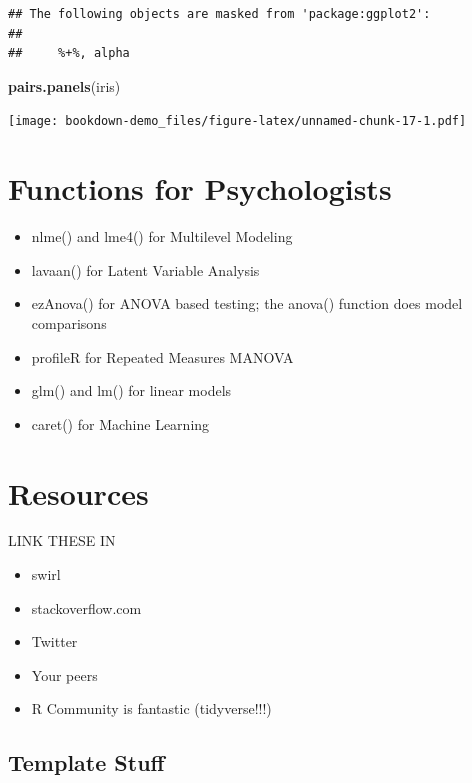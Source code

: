 \documentclass[]{book}
\newenvironment{Shaded}{\begin{snugshade}}{\end{snugshade}}
\newcommand{\KeywordTok}[1]{\textcolor[rgb]{0.13,0.29,0.53}{\textbf{#1}}}
\newcommand{\NormalTok}[1]{#1}
\providecommand{\tightlist}{%
  \setlength{\itemsep}{0pt}\setlength{\parskip}{0pt}}
\theoremstyle{definition}
\theoremstyle{definition}
\theoremstyle{definition}
\theoremstyle{remark}
\begin{document}
\begin{verbatim}
## The following objects are masked from 'package:ggplot2':
## 
##     %+%, alpha
\end{verbatim}

\begin{Shaded}
\begin{Highlighting}[]
\KeywordTok{pairs.panels}\NormalTok{(iris)}
\end{Highlighting}
\end{Shaded}

\texttt{[image: bookdown-demo\_files/figure-latex/unnamed-chunk-17-1.pdf]}

\section{Functions for Psychologists}\label{functions-for-psychologists}

\begin{itemize}
\tightlist
\item
  nlme() and lme4() for Multilevel Modeling
\item
  lavaan() for Latent Variable Analysis
\item
  ezAnova() for ANOVA based testing; the anova() function does model
  comparisons
\item
  profileR for Repeated Measures MANOVA
\item
  glm() and lm() for linear models
\item
  caret() for Machine Learning
\end{itemize}

\section{Resources}\label{resources}

LINK THESE IN

\begin{itemize}
\tightlist
\item
  swirl
\item
  stackoverflow.com
\item
  Twitter
\item
  Your peers
\item
  R Community is fantastic (tidyverse!!!)
\end{itemize}

\subsection{Template Stuff}\label{template-stuff}
\end{document}
